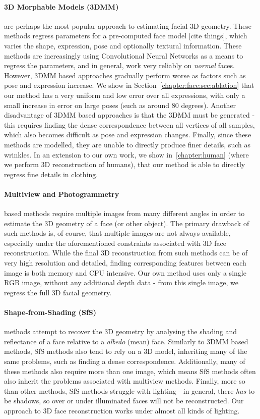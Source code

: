 \paragraph{3D Morphable Models (3DMM)} are perhaps the most popular
approach to estimating facial 3D geometry. These methods regress
parameters for a pre-computed face model [cite things], which varies
the shape, expression, pose and optionally textural information. These
methods are increasingly using Convolutional Neural Networks as a
means to regress the parameters, and in general, work very reliably on
\textit{normal} faces. However, 3DMM based approaches gradually
perform worse as factors such as pose and expression increase. We show
in Section~\ref{chapter:face:sec:ablation} that our method has a very
uniform and low error over all expressions, with only a small increase
in error on large poses (such as around 80 degrees). Another
disadvantage of 3DMM based approaches is that the 3DMM must be
generated - this requires finding the dense correspondence between all
vertices of all samples, which also becomes difficult as pose and
expression changes. Finally, since these methods are modelled, they
are unable to directly produce finer details, such as wrinkles. In an
extension to our own work, we show in~\ref{chapter:human} (where we
perform 3D reconstruction of humans), that our method is able to
directly regress fine details in clothing.


\paragraph{Multiview and Photogrammetry} based methods require
multiple images from many different angles in order to estimate the 3D
geometry of a face (or other object). The primary drawback of such
methods is, of course, that multiple images are not always available,
especially under the aforementioned constraints associated with 3D
face reconstruction. While the final 3D reconstruction from such
methods can be of very high resolution and detailed, finding
corresponding features between each image is both memory and CPU
intensive. Our own method uses only a single RGB image, without any
additional depth data - from this single image, we regress the full 3D
facial geometry.

\paragraph{Shape-from-Shading (SfS)} methods attempt to recover the 3D
geometry by analysing the shading and reflectance of a face relative
to a \textit{albedo} (mean) face. Similarly to 3DMM based methods, SfS
methods also tend to rely on a 3D model, inheriting many of the same
problems, such as finding a dense correspondence. Additionally, many
of these methods also require more than one image, which means SfS
methods often also inherit the problems associated with multiview
methods. Finally, more so than other methods, SfS methods struggle
with lighting - in general, there \textit{has} to be shadows, so over
or under illuminated faces will not be reconstructed. Our approach to
3D face reconstruction works under almost all kinds of lighting.

